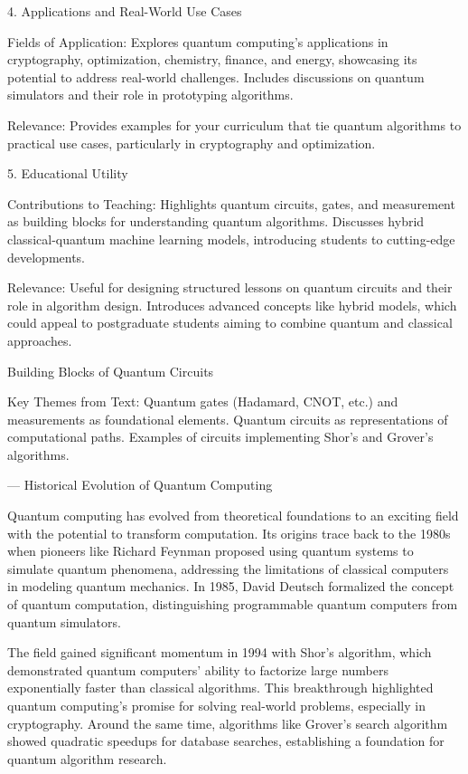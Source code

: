 4. Applications and Real-World Use Cases

    Fields of Application:
        Explores quantum computing’s applications in cryptography, optimization, chemistry, finance, and energy, showcasing its potential to address real-world challenges.
        Includes discussions on quantum simulators and their role in prototyping algorithms.

    Relevance:
        Provides examples for your curriculum that tie quantum algorithms to practical use cases, particularly in cryptography and optimization.

5. Educational Utility

    Contributions to Teaching:
        Highlights quantum circuits, gates, and measurement as building blocks for understanding quantum algorithms.
        Discusses hybrid classical-quantum machine learning models, introducing students to cutting-edge developments.

    Relevance:
        Useful for designing structured lessons on quantum circuits and their role in algorithm design.
        Introduces advanced concepts like hybrid models, which could appeal to postgraduate students aiming to combine quantum and classical approaches.

Building Blocks of Quantum Circuits

    Key Themes from Text:
        Quantum gates (Hadamard, CNOT, etc.) and measurements as foundational elements.
        Quantum circuits as representations of computational paths.
        Examples of circuits implementing Shor’s and Grover’s algorithms.


        ---
        Historical Evolution of Quantum Computing

Quantum computing has evolved from theoretical foundations to an exciting field with the potential to transform computation. Its origins trace back to the 1980s when pioneers like Richard Feynman proposed using quantum systems to simulate quantum phenomena, addressing the limitations of classical computers in modeling quantum mechanics. In 1985, David Deutsch formalized the concept of quantum computation, distinguishing programmable quantum computers from quantum simulators.

The field gained significant momentum in 1994 with Shor’s algorithm, which demonstrated quantum computers' ability to factorize large numbers exponentially faster than classical algorithms. This breakthrough highlighted quantum computing's promise for solving real-world problems, especially in cryptography. Around the same time, algorithms like Grover’s search algorithm showed quadratic speedups for database searches, establishing a foundation for quantum algorithm research.


